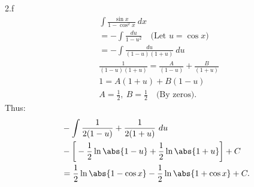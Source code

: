 \documentclass{report}
\begin{document}
    \bigbreak \noindent 
    2.f
    \bigbreak \noindent 
    \begin{align*}
        &\int \frac{\sin{x}}{1-\cos^{2}{x}}\ dx \\
        &=-\int \frac{du}{1-u^{2}} \quad \text{(Let $u=\cos{x}$)} \\
        &=-\int \frac{du}{(1-u)(1+u)}\ du \\
        &\frac{1}{(1-u)(1+u)} = \frac{A}{(1-u)} + \frac{B}{(1+u)} \\
        &1 = A(1+u) + B(1-u) \\
        &A = \frac{1}{2},\ B=\frac{1}{2} \quad \text{(By zeros)}
    .\end{align*}
    \bigbreak \noindent 
    Thus:
    \begin{align*}
     &-\int \frac{1}{2(1-u)} + \frac{1}{2(1+u)}\ du \\
     &-\bigg[-\frac{1}{2}\ln{\abs{1-u}} +\frac{1}{2}\ln{\abs{1+u}}\bigg] + C \\
     &=\frac{1}{2}\ln{\abs{1-\cos{x}}} - \frac{1}{2}\ln{\abs{1+\cos{x}}} + C
    .\end{align*}



    
    
\end{document}
